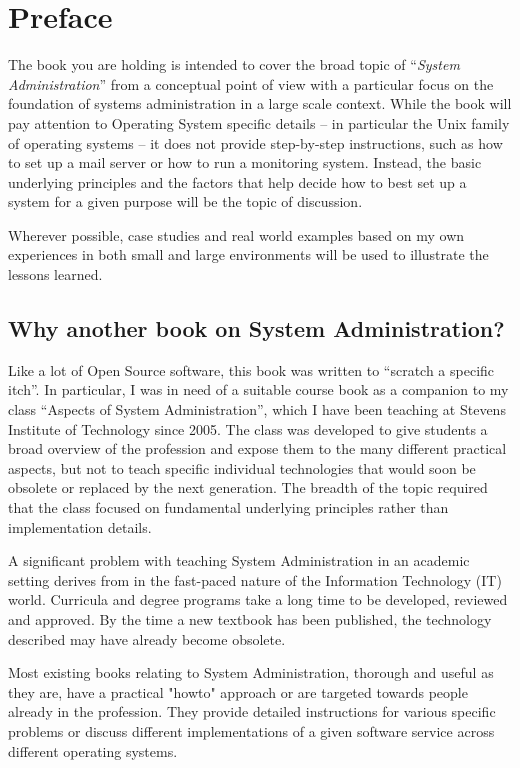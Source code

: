 \chapter{Preface}

The book you are holding is intended to cover the
broad topic of ``{\em System Administration}'' from a
conceptual point of view with a particular focus on
the foundation of systems administration in a large
scale context.  While the book will pay attention to
Operating System specific details -- in particular the
Unix family of operating systems -- it does not
provide step-by-step instructions, such as  how to set
up a mail server or how to run a monitoring system.
Instead, the basic underlying principles and the
factors that help decide how to best set up a system
for a given purpose will be the topic of discussion.

Wherever possible, case studies and real world
examples based on my own experiences in both small and
large environments will be used to illustrate the
lessons learned.

\section*{Why another book on System Administration?}

Like a lot of Open Source software, this book was
written to ``scratch a specific itch''.  In
particular, I was in need of a suitable course book as
a companion to my class ``Aspects of System
Administration'', which I have been teaching at
Stevens Institute of Technology since 2005.  The class was
developed to give students a broad overview of the
profession and expose them to the many different
practical aspects, but not to teach specific
individual technologies that would soon be obsolete or
replaced by the next generation.  The breadth of the
topic required that the class focused on fundamental
underlying principles rather than implementation
details.

A significant problem with teaching System
Administration in an academic setting derives from in
the fast-paced nature of the Information
Technology (IT) world.
Curricula and degree programs take a long time to be
developed, reviewed and approved.  By the time a new
textbook has been published, the technology described
may have already become obsolete.

Most existing books relating to System Administration,
thorough and useful as they are, have a practical
"howto" approach or are targeted towards people
already in the profession.  They provide detailed
instructions for various specific problems or discuss
different implementations of a given software service
across different operating systems.

